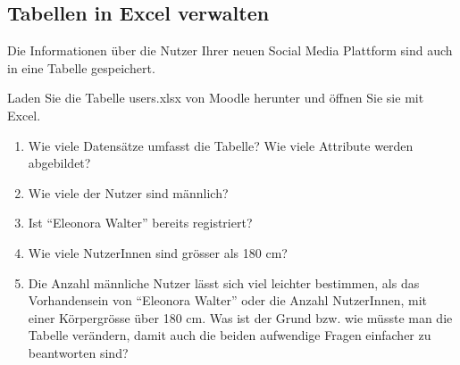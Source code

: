 \subsection{Tabellen in Excel verwalten}
\label{subsec:TabelleInExcel}

Die Informationen über die Nutzer Ihrer neuen Social Media Plattform sind auch in eine Tabelle gespeichert.

\begin{myexercise}
    \label{myexercise:usersinExcel}
      Laden Sie die Tabelle users.xlsx von Moodle herunter und öffnen Sie sie mit Excel.
    \begin{enumerate}
        \item Wie viele Datensätze umfasst die Tabelle? Wie viele Attribute werden abgebildet?
        \item Wie viele der Nutzer sind männlich?
        \item Ist \enquote{Eleonora Walter} bereits registriert?
        \item Wie viele NutzerInnen sind grösser als 180 cm?
        \item Die Anzahl männliche Nutzer lässt sich viel leichter bestimmen, als das Vorhandensein von \enquote{Eleonora Walter} oder die Anzahl NutzerInnen, mit einer Körpergrösse über 180 cm. Was ist der Grund bzw. wie müsste man die Tabelle verändern, damit auch die beiden aufwendige Fragen einfacher zu beantworten sind?
    \end{enumerate}
\end{myexercise}



